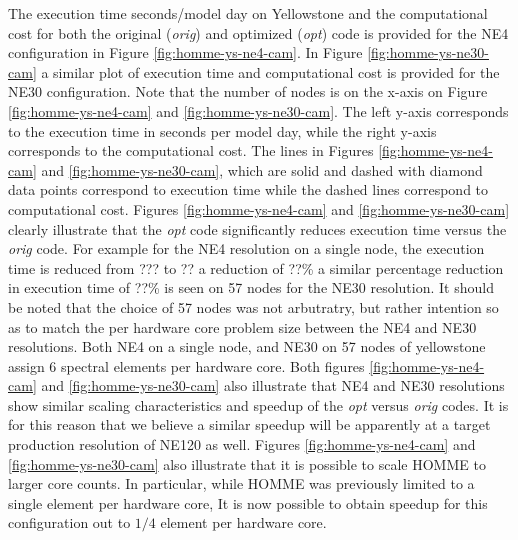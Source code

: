
The execution time seconds/model day on Yellowstone and the computational cost for both the original ({\em orig})  and optimized ({\em opt}) code is provided for the NE4 configuration in Figure \ref{fig:homme-ys-ne4-cam}. In Figure \ref{fig:homme-ys-ne30-cam} a similar plot of execution time and computational cost is provided for the NE30 configuration.  Note that the number of nodes is on the x-axis on Figure \ref{fig:homme-ys-ne4-cam} and \ref{fig:homme-ys-ne30-cam}.  The left y-axis corresponds to the execution time in seconds per model day, while the right y-axis corresponds to the computational cost. The lines in Figures \ref{fig:homme-ys-ne4-cam} and \ref{fig:homme-ys-ne30-cam}, which are solid and dashed with diamond data points correspond to execution time while the dashed lines  correspond to computational cost.  Figures  \ref{fig:homme-ys-ne4-cam} and \ref{fig:homme-ys-ne30-cam} clearly illustrate that the {\em opt} code significantly reduces execution time versus the {\em orig} code.  For example for the NE4 resolution on a single node, the execution time is reduced from ??? to ?? a reduction of ??\% a similar percentage reduction in execution time of ??\% is seen on 57 nodes for the NE30 resolution.  It should be  noted that the choice of 57 nodes was not arbutratry, but rather intention so as to match the per hardware core problem size between the NE4 and NE30 resolutions.  Both  NE4 on a single node, and NE30 on 57 nodes of yellowstone assign 6 spectral elements per hardware core.  Both figures \ref{fig:homme-ys-ne4-cam} and \ref{fig:homme-ys-ne30-cam} also illustrate that NE4 and NE30 resolutions show similar scaling characteristics and speedup of the {\em opt} versus {\em orig} codes. It is for this reason that we believe a similar speedup will be apparently at a target production resolution of NE120 as well.   Figures \ref{fig:homme-ys-ne4-cam} and \ref{fig:homme-ys-ne30-cam} also illustrate that it is possible to scale HOMME to larger core counts.  In particular, while HOMME was previously limited to a single element per hardware core, It is now possible to obtain speedup for this configuration out to $1/4$ element per hardware core.
 
